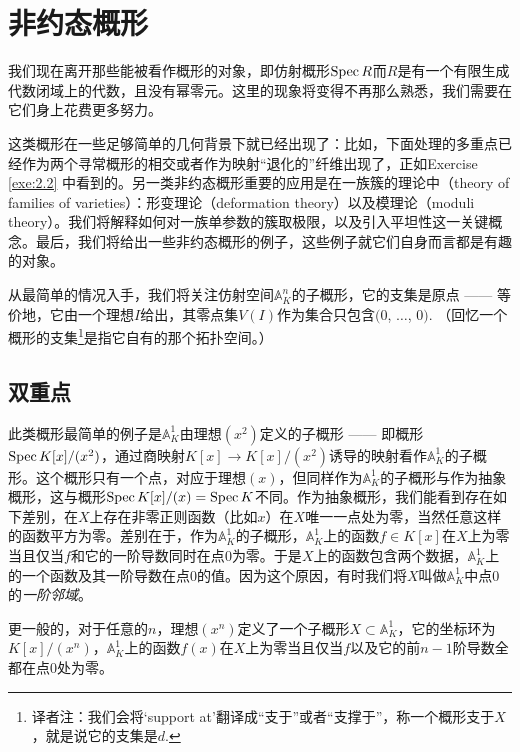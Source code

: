 \section{非约态概形}

我们现在离开那些能被看作概形的对象，即仿射概形$\operatorname{Spec} R$而$R$是有一个有限生成代数闭域上的代数，且没有幂零元。这里的现象将变得不再那么熟悉，我们需要在它们身上花费更多努力。

这类概形在一些足够简单的几何背景下就已经出现了：比如，下面处理的多重点已经作为两个寻常概形的相交或者作为映射“退化的”纤维出现了，正如Exercise \ref{exe:2.2} 中看到的。另一类非约态概形重要的应用是在一族簇的理论中（theory of families of varieties）：形变理论（deformation theory）以及模理论（moduli theory）。我们将解释如何对一族单参数的簇取极限，以及引入平坦性这一关键概念。最后，我们将给出一些非约态概形的例子，这些例子就它们自身而言都是有趣的对象。

从最简单的情况入手，我们将关注仿射空间$\mathbb{A}_K^n$的子概形，它的支集是原点 ------ 等价地，它由一个理想$I$给出，其零点集$V(I)$作为集合只包含$(0$, $\dots$, $0)$. （回忆一个概形的支集\footnote{译者注：我们会将`support at'翻译成“支于”或者“支撑于”，称一个概形支于$X$，就是说它的支集是$d$.}是指它自有的那个拓扑空间。）

\subsection{双重点}\label{s:2.3.1}
\begin{exa}
	此类概形最简单的例子是$\mathbb{A}_K^1$由理想$(x^2)$定义的子概形 ------ 即概形$\operatorname{Spec} K[x]/(x^2)$，通过商映射$K[x]\to K[x]/(x^2)$诱导的映射看作$\mathbb{A}_K^1$的子概形。这个概形只有一个点，对应于理想$(x)$，但同样作为$\mathbb{A}_K^1$的子概形与作为抽象概形，这与概形$\operatorname{Spec} K[x]/(x)=\operatorname{Spec} K$不同。作为抽象概形，我们能看到存在如下差别，在$X$上存在非零正则函数（比如$x$）在$X$唯一一点处为零，当然任意这样的函数平方为零。差别在于，作为$\mathbb{A}_K^1$的子概形，$\mathbb{A}_K^1$上的函数$f\in K[x]$在$X$上为零当且仅当$f$和它的一阶导数同时在点$0$为零。于是$X$上的函数包含两个数据，$\mathbb{A}_K^1$上的一个函数及其一阶导数在点$0$的值。因为这个原因，有时我们将$X$叫做$\mathbb{A}_K^1$中点$0$的\textit{一阶邻域}。
\end{exa}

更一般的，对于任意的$n$，理想$(x^n)$定义了一个子概形$X\subset \mathbb{A}_K^1$，它的坐标环为$K[x]/(x^n)$，$\mathbb{A}_K^1$上的函数$f(x)$在$X$上为零当且仅当$f$以及它的前$n-1$阶导数全都在点$0$处为零。

